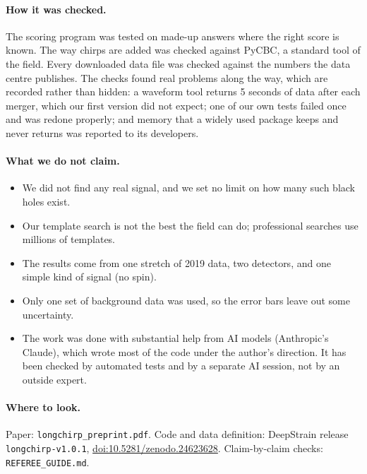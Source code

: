 \documentclass[11pt]{article}
\begin{document}
\paragraph{How it was checked.} The scoring program was tested on made-up answers where the right score is known.
The way chirps are added was checked against PyCBC, a standard tool of the field. Every downloaded data file was
checked against the numbers the data centre publishes. The checks found real problems along the way, which are
recorded rather than hidden: a waveform tool returns 5 seconds of data after each merger, which our first version
did not expect; one of our own tests failed once and was redone properly; and memory that a widely used package keeps
and never returns was reported to its developers.

\paragraph{What we do not claim.}
\begin{itemize}
\item We did not find any real signal, and we set no limit on how many such black holes exist.
\item Our template search is not the best the field can do; professional searches use millions of templates.
\item The results come from one stretch of 2019 data, two detectors, and one simple kind of signal (no spin).
\item Only one set of background data was used, so the error bars leave out some uncertainty.
\item The work was done with substantial help from AI models (Anthropic's Claude), which wrote most of the code under
the author's direction. It has been checked by automated tests and by a separate AI session, not by an outside
expert.
\end{itemize}

\paragraph{Where to look.} Paper: \texttt{longchirp\_preprint.pdf}. Code and data definition: DeepStrain release
\texttt{longchirp-v1.0.1}, \href{https://doi.org/10.5281/zenodo.24623628}{doi:10.5281/zenodo.24623628}.
Claim-by-claim checks: \texttt{REFEREE\_GUIDE.md}.
\end{document}
